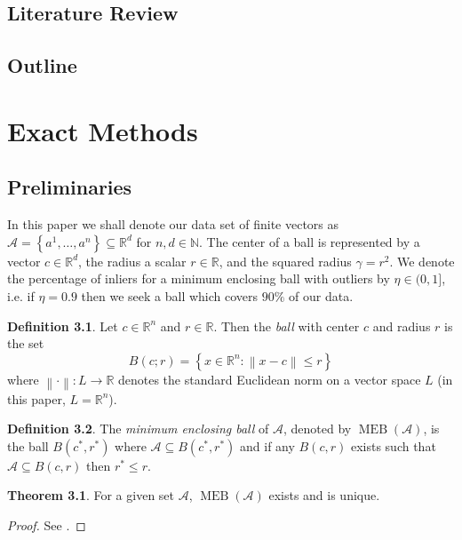 \documentclass[11pt,twoside]{report}
\newcommand{\A}{\mathcal{A}} %
\newcommand{\norm}[1]{\left\lVert#1\right\rVert}
\DeclareMathOperator{\MEB}{MEB}
\theoremstyle{definition}
\newtheorem{definition}{Definition}
\newtheorem{theorem}{Theorem}
\numberwithin{theorem}{section}
\numberwithin{definition}{section}
\numberwithin{lemma}{section}
\numberwithin{proposition}{section}
\numberwithin{equation}{section}
\begin{document}
\section{Literature Review}\label{lit review}
\section{Outline}

\chapter{Exact Methods}\label{exact}
\section{Preliminaries}
In this paper we shall denote our data set of finite vectors as $\mathcal{A} = \left\{a^1,\ldots,a^n\right\}\subseteq\mathbb{R}^d$ for $n,d\in\mathbb{N}$. The center of a ball is represented by a vector $c\in\mathbb{R}^d$, the radius a scalar $r\in\mathbb{R}$, and the squared radius $\gamma=r^2$. We denote the percentage of inliers for a minimum enclosing ball with outliers by $\eta\in(0,1]$, i.e. if $\eta=0.9$ then we seek a ball which covers $90\%$ of our data.

\begin{definition}
Let $c\in\mathbb{R}^n$ and $r\in\mathbb{R}$. Then the \textit{ball} with center $c$ and radius $r$ is the set
\begin{equation*}
    B(c;r) = \left\{x\in\mathbb{R}^n : \norm{x-c} \leq r\right\}
\end{equation*}
where $\norm{\cdot}:L\to\mathbb{R}$ denotes the standard Euclidean norm on a vector space $L$ (in this paper, $L=\mathbb{R}^n$).
\end{definition}

\begin{definition}
The \textit{minimum enclosing ball} of $\A$, denoted by $\MEB(\A)$, is the ball $B(c^*,r^*)$ where $\A\subseteq B(c^*,r^*)$ and if any $B(c,r)$ exists such that $\mathcal{A}\subseteq B(c,r)$ then $r^*\leq r$.
\end{definition}

\begin{theorem}
For a given set $\A$, $\MEB(\A)$ exists and is unique.
\end{theorem}
\begin{proof}
See \cite[page 5]{two-algorithms}.
\end{proof}
\end{document}
